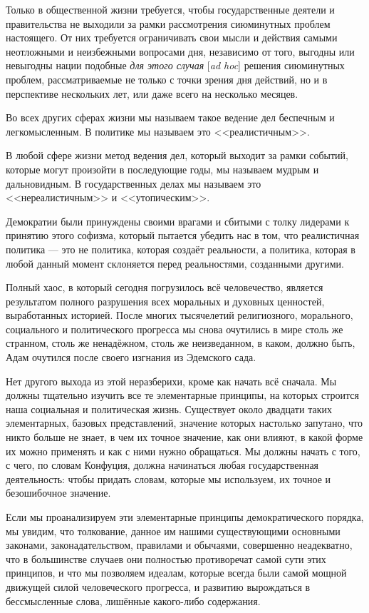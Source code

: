 Только в общественной жизни требуется, чтобы государственные деятели и правительства не выходили за рамки рассмотрения сиюминутных проблем настоящего. От них требуется ограничивать свои мысли и действия самыми неотложными и неизбежными вопросами дня, независимо от того, выгодны или невыгодны нации подобные \textit{для этого случая} [\textit{ad hoc}] решения сиюминутных проблем, рассматриваемые не только с точки зрения дня действий, но и в перспективе нескольких лет, или даже всего на несколько месяцев.

Во всех других сферах жизни мы называем такое ведение дел беспечным и легкомысленным. В политике мы называем это <<реалистичным>>.

В любой сфере жизни метод ведения дел, который выходит за рамки событий, которые могут произойти в последующие годы, мы называем мудрым и дальновидным. В государственных делах мы называем это <<нереалистичным>> и <<утопическим>>.

Демократии были принуждены своими врагами и сбитыми с толку лидерами к принятию этого софизма, который пытается убедить нас в том, что реалистичная политика — это не политика, которая создаёт реальности, а политика, которая в любой данный момент склоняется перед реальностями, созданными другими.

Полный хаос, в который сегодня погрузилось всё человечество, является результатом полного разрушения всех моральных и духовных ценностей, выработанных историей. После многих тысячелетий религиозного, морального, социального и политического прогресса мы снова очутились в мире столь же странном, столь же ненадёжном, столь же неизведанном, в каком, должно быть, Адам очутился после своего изгнания из Эдемского сада.

Нет другого выхода из этой неразберихи, кроме как начать всё сначала. Мы должны тщательно изучить все те элементарные принципы, на которых строится наша социальная и политическая жизнь. Существует около двадцати таких элементарных, базовых представлений, значение которых настолько запутано, что никто больше не знает, в чем их точное значение, как они влияют, в какой форме их можно применять и как с ними нужно обращаться. Мы должны начать с того, с чего, по словам Конфуция, должна начинаться любая государственная деятельность: чтобы придать словам, которые мы используем, их точное и безошибочное значение.

Если мы проанализируем эти элементарные принципы демократического порядка, мы увидим, что толкование, данное им нашими существующими основными законами, законадательством, правилами и обычаями, совершенно неадекватно, что в большинстве случаев они полностью противоречат самой сути этих принципов, и что мы позволяем идеалам, которые всегда были самой мощной движущей силой человеческого прогресса, и развитию вырождаться в бессмысленные слова, лишённые какого-либо содержания.

